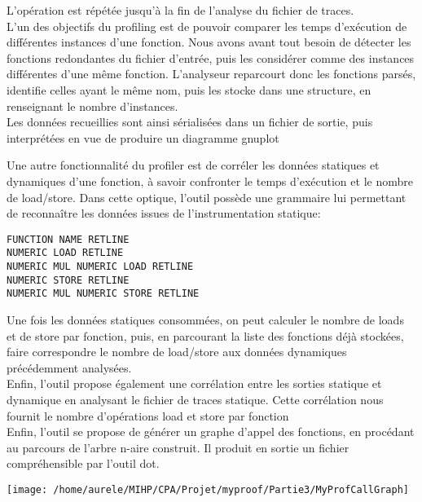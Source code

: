 \documentclass[oneside,11pt]{article}
\begin{document}
L'opération est répétée jusqu'à la fin de l'analyse du fichier de traces.\\

L'un des objectifs du profiling est de pouvoir comparer les temps d'exécution de différentes instances d'une fonction. Nous avons avant tout besoin de détecter les fonctions redondantes du fichier d'entrée, puis les considérer comme des instances différentes d'une même fonction.
L'analyseur reparcourt donc les fonctions parsés, identifie celles ayant le même nom, puis les stocke dans une structure, en renseignant le nombre d'instances.\\
Les données recueillies sont ainsi sérialisées dans un fichier de sortie, puis interprétées en vue de produire un diagramme gnuplot 



Une autre fonctionnalité du profiler est de corréler les données statiques et dynamiques d'une fonction, à savoir confronter le temps d'exécution et le nombre de load/store. Dans cette optique, l'outil possède une grammaire lui permettant de reconnaître les données issues de l'instrumentation statique:

\begin{verbatim}
FUNCTION NAME RETLINE
NUMERIC LOAD RETLINE
NUMERIC MUL NUMERIC LOAD RETLINE
NUMERIC STORE RETLINE
NUMERIC MUL NUMERIC STORE RETLINE
\end{verbatim}

Une fois les données statiques consommées, on peut calculer le nombre de loads et de store par fonction, puis, en parcourant la liste des fonctions déjà stockées, faire correspondre le nombre de load/store aux données dynamiques précédemment analysées.\\

Enfin, l'outil propose également une corrélation entre les sorties statique et dynamique en analysant le fichier de traces statique. Cette corrélation nous fournit le nombre d'opérations load et store par fonction\\

Enfin, l'outil se propose de générer un graphe d'appel des fonctions, en procédant au parcours de l'arbre n-aire construit. Il produit en sortie un fichier compréhensible par l'outil dot. 

\begin{center}
	\texttt{[image: /home/aurele/MIHP/CPA/Projet/myproof/Partie3/MyProfCallGraph]}
\end{center}
\end{document}
